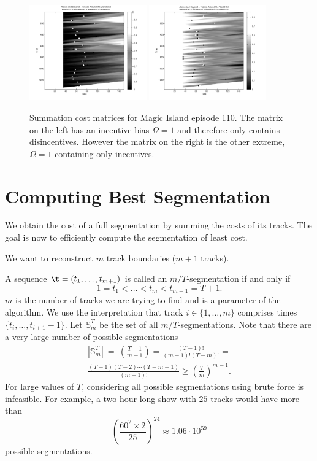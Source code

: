 \documentclass[twocolumn]{article}
\newcommand{\segs}{\mathbb S}
\begin{document}
		\begin{figure}[t]
			\centering
			\includegraphics[width=0.45\textwidth]{images/cmsumib1}
			\includegraphics[width=0.45\textwidth]{images/cmsumib0}
			\caption{Summation cost matrices for Magic Island episode 110. The matrix on the left has an incentive bias $\Omega=1$ and therefore only contains disincentives. However the matrix on the right is the other extreme, $\Omega=1$ containing only incentives. }
			\label{fig:cmsumib1}
		\end{figure} 
	
	
	\section{Computing Best Segmentation}\label{best_cost}
	
	We obtain the cost of a full segmentation by summing the costs of its tracks. The goal is now to efficiently compute the segmentation of least cost.
	
	We want to reconstruct $m$ track boundaries ($m+1$ tracks).
	
	A sequence $\t = (t_1, \ldots, t_{m+1})$ is called an $m/T$-segmentation if and only if
	\[
	1 = t_1 < \ldots < t_m < t_{m+1} = T+1.
	\]
	$m$ is the number of tracks we are trying to find and is a parameter of the algorithm. We use the interpretation that track $i \in \{1, \ldots, m\}$ comprises times $\{t_i, \ldots, t_{i+1}-1\}$. Let $\segs^T_m$ be the set of all $m/T$-segmentations. Note that there are a very large number of possible segmentations 
	\begin{multline*}
		|\segs^T_m| ~=~ \binom{T-1}{m-1}
		= \frac{(T-1)!}{(m-1)!(T-m)!} =\\
		\frac{(T-1)(T-2)\cdots(T-m+1)}{(m-1)!} \ge \left( \frac{T}{m}\right)^{m-1}.
	\end{multline*} 
	For large values of $T$, considering all possible segmentations using brute force is infeasible. For example, a two hour long show with $25$ tracks would have more than 
	\[
	\left( \frac{60^2 \times 2}{25}\right)^{24}  \approx 1.06 \cdot 10^{59}
	\] possible segmentations. 
	
\end{document}
